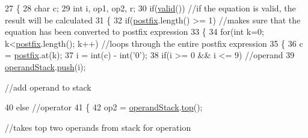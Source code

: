 \begin{DoxyCode}
27 \{
28    \textcolor{keywordtype}{char} c;
29    \textcolor{keywordtype}{int} i, op1, op2, r;
30    \textcolor{keywordflow}{if}(\hyperlink{classAlgebraicExpression_aa3c08af8a2b4d67c356f3cf69b2f6bc6}{valid}()) \textcolor{comment}{//if the equation is valid, the result will be calculated                              
                                                                                                            }
31    \{
32       \textcolor{keywordflow}{if}(\hyperlink{classAlgebraicExpression_a0c9827f84bf13c0f0f4a096e72462a44}{postfix}.length() >= 1) \textcolor{comment}{//makes sure that the equation has been converted to postfix
       expression                                                                                                     }
33       \{
34          \textcolor{keywordflow}{for}(\textcolor{keywordtype}{int} k=0; k<\hyperlink{classAlgebraicExpression_a0c9827f84bf13c0f0f4a096e72462a44}{postfix}.length(); k++) \textcolor{comment}{//loops through the entire postfix expression        
                                                                                                              }
35          \{
36             c = \hyperlink{classAlgebraicExpression_a0c9827f84bf13c0f0f4a096e72462a44}{postfix}.at(k);
37             i = int(c) - int(\textcolor{charliteral}{'0'});
38             \textcolor{keywordflow}{if}(i >= 0 && i <= 9) \textcolor{comment}{//operand                                                                 
                                                                                                       }
39                \hyperlink{classAlgebraicExpression_a8f0ee1ac59e782a546a7de47e507b391}{operandStack}.\hyperlink{classStack_a3553a0aa2c9640c5266e4d8790863e2e}{push}(i); \textcolor{comment}{//add operand to stack                                
                                                                                                                  
           }
40             \textcolor{keywordflow}{else} \textcolor{comment}{//operator                                                                                
                                                                                                       }
41             \{
42                op2 = \hyperlink{classAlgebraicExpression_a8f0ee1ac59e782a546a7de47e507b391}{operandStack}.\hyperlink{classStack_ad461f6de40c8672dbf743068f4515061}{top}(); \textcolor{comment}{//takes top two operands from stack for operation  
                                                                                                                  
}
\end{DoxyCode}
